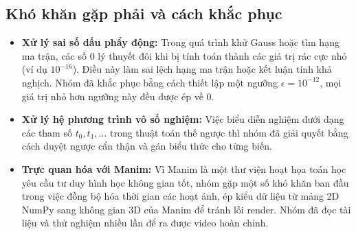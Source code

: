 \subsection{Khó khăn gặp phải và cách khắc phục}
\begin{itemize}
    \item \textbf{Xử lý sai số dấu phẩy động:} Trong quá trình khử Gauss hoặc tìm hạng ma trận, các số 0 lý thuyết đôi khi bị tính toán thành các giá trị rác cực nhỏ (ví dụ $10^{-16}$). Điều này làm sai lệch hạng ma trận hoặc kết luận tính khả nghịch. Nhóm đã khắc phục bằng cách thiết lập một ngưỡng $\epsilon = 10^{-12}$, mọi giá trị nhỏ hơn ngưỡng này đều được ép về 0.
    \item \textbf{Xử lý hệ phương trình vô số nghiệm:} Việc biểu diễn nghiệm dưới dạng các tham số $t_0, t_1, \dots$ trong thuật toán thế ngược thì nhóm đã giải quyết bằng cách duyệt ngược cẩn thận và gán biểu thức cho từng biến.
    \item \textbf{Trực quan hóa với Manim:} Vì Manim là một thư viện hoạt họa toán học yêu cầu tư duy hình học không gian tốt, nhóm gặp một số khó khăn ban đầu trong việc đồng bộ hóa thời gian các hoạt ảnh, ép kiểu dữ liệu từ mảng 2D NumPy sang không gian 3D của Manim để tránh lỗi render. Nhóm đã đọc tài liệu và thử nghiệm nhiều lần để ra được video hoàn chỉnh.
\end{itemize}